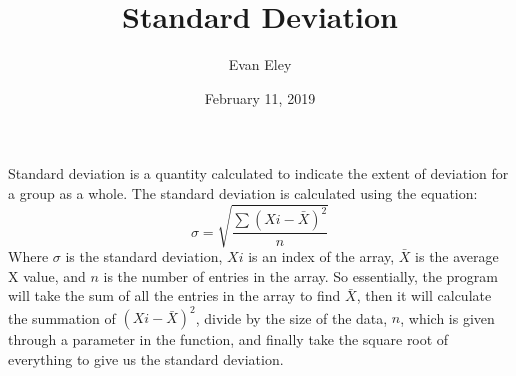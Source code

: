 \documentclass{article} \usepackage[utf8]{inputenc} \title{Standard Deviation}
\author{Evan Eley} \date{February 11, 2019}
\begin{document}
 \maketitle \vspace{25mm} 
Standard deviation is a quantity calculated to indicate the extent of deviation for a 
group as a whole. The standard deviation is calculated using the equation: 
\begin{equation}
    \sigma = \sqrt{\frac{\sum (Xi - \bar{X})^2}{n}} \end{equation} Where $\sigma$ is 
the standard deviation, $Xi$ is an index of the array, $\bar{X}$ is the average X 
value, and $n$ is the number of entries in the array. So essentially, the program 
will take the sum of all the entries in the array to find $\bar{X}$, then it will 
calculate the summation of $(Xi - \bar{X})^2$, divide by the size of the data, $n$, 
which is given through a parameter in the function, and finally take the square root 
of everything to give us the standard deviation.
\end{document}
